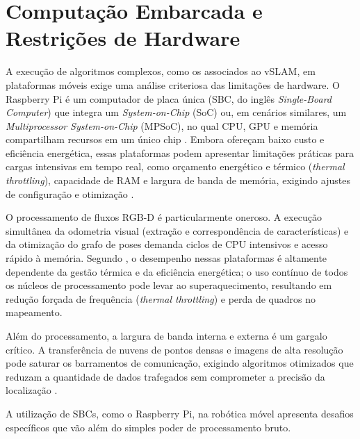 \section{Computação Embarcada e Restrições de Hardware}

A execução de algoritmos complexos, como os associados ao vSLAM, em plataformas móveis exige uma análise criteriosa das limitações de hardware. O Raspberry Pi é um computador de placa única (SBC, do inglês \textit{Single-Board Computer}) que integra um \textit{System-on-Chip} (SoC) ou, em cenários similares, um \textit{Multiprocessor System-on-Chip} (MPSoC), no qual CPU, GPU e memória compartilham recursos em um único chip \cite{raspberrypi2019raspberrypi}. Embora ofereçam baixo custo e eficiência energética, essas plataformas podem apresentar limitações práticas para cargas intensivas em tempo real, como orçamento energético e térmico (\emph{thermal throttling}), capacidade de RAM e largura de banda de memória, exigindo ajustes de configuração e otimização \cite{costa2019characterizingpolybenchgpu, balado2025systematicliteraturereview}.

O processamento de fluxos RGB-D é particularmente oneroso. A execução simultânea da odometria visual (extração e correspondência de características) e da otimização do grafo de poses demanda ciclos de CPU intensivos e acesso rápido à memória. Segundo , o desempenho nessas plataformas é altamente dependente da gestão térmica e da eficiência energética; o uso contínuo de todos os núcleos de processamento pode levar ao superaquecimento, resultando em redução forçada de frequência (\textit{thermal throttling}) e perda de quadros no mapeamento.

Além do processamento, a largura de banda interna e externa é um gargalo crítico. A transferência de nuvens de pontos densas e imagens de alta resolução pode saturar os barramentos de comunicação, exigindo algoritmos otimizados que reduzam a quantidade de dados trafegados sem comprometer a precisão da localização \cite{zheng2016multiframegraphmatching}.

A utilização de SBCs, como o Raspberry Pi, na robótica móvel apresenta desafios específicos que vão além do simples poder de processamento bruto. 

